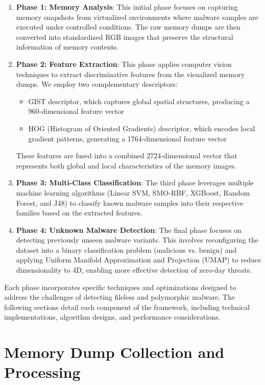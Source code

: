 \begin{enumerate}
    \item \textbf{Phase 1: Memory Analysis}: This initial phase focuses on capturing memory snapshots from virtualized environments where malware samples are executed under controlled conditions. The raw memory dumps are then converted into standardized RGB images that preserve the structural information of memory contents.
    
    \item \textbf{Phase 2: Feature Extraction}: This phase applies computer vision techniques to extract discriminative features from the visualized memory dumps. We employ two complementary descriptors:
    \begin{itemize}
        \item GIST descriptor, which captures global spatial structures, producing a 960-dimensional feature vector
        \item HOG (Histogram of Oriented Gradients) descriptor, which encodes local gradient patterns, generating a 1764-dimensional feature vector
    \end{itemize}
    These features are fused into a combined 2724-dimensional vector that represents both global and local characteristics of the memory images.
    
    \item \textbf{Phase 3: Multi-Class Classification}: The third phase leverages multiple machine learning algorithms (Linear SVM, SMO-RBF, XGBoost, Random Forest, and J48) to classify known malware samples into their respective families based on the extracted features.
    
    \item \textbf{Phase 4: Unknown Malware Detection}: The final phase focuses on detecting previously unseen malware variants. This involves reconfiguring the dataset into a binary classification problem (malicious vs. benign) and applying Uniform Manifold Approximation and Projection (UMAP) to reduce dimensionality to 4D, enabling more effective detection of zero-day threats.
\end{enumerate}

Each phase incorporates specific techniques and optimizations designed to address the challenges of detecting fileless and polymorphic malware. The following sections detail each component of the framework, including technical implementations, algorithm designs, and performance considerations.

\section{Memory Dump Collection and Processing}
\label{sec:memory-dump-collection}

